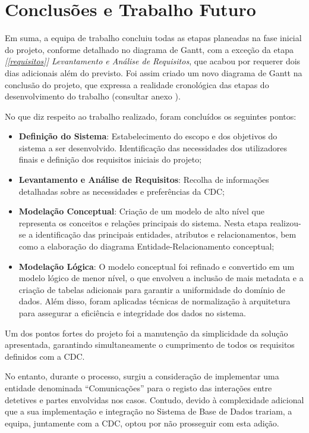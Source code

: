 \documentclass[a4paper,12pt]{scrreprt}
\begin{document}
\chapter{Conclusões e Trabalho Futuro}

    Em suma, a equipa de trabalho concluiu todas as etapas planeadas na fase inicial do projeto, conforme detalhado no diagrama de Gantt, com a exceção da etapa \textit{[\ref{requisitos}] Levantamento e Análise de Requisitos}, que acabou por requerer dois dias adicionais além do previsto. Foi assim criado um novo diagrama de Gantt na conclusão do projeto, que expressa a realidade cronológica das etapas do desenvolvimento do trabalho (consultar anexo \textit{}).

    No que diz respeito ao trabalho realizado, foram concluídos os seguintes pontos:
    \begin{itemize}
        \item \textbf{Definição do Sistema}: Estabelecimento do escopo e dos objetivos do sistema a ser desenvolvido. Identificação das necessidades dos utilizadores finais e definição dos requisitos iniciais do projeto;
        \item \textbf{Levantamento e Análise de Requisitos}: Recolha de informações detalhadas sobre as necessidades e preferências da CDC;
        \item \textbf{Modelação Conceptual}: Criação de um modelo de alto nível que representa os conceitos e relações principais do sistema. Nesta etapa realizou-se a identificação das principais entidades, atributos e relacionamentos, bem como a elaboração do diagrama
        Entidade-Relacionamento conceptual;
        \item \textbf{Modelação Lógica}: O modelo conceptual foi refinado e convertido em um modelo lógico de menor nível, o que envolveu a inclusão de mais metadata e a criação de tabelas adicionais para garantir a uniformidade do domínio de dados. Além disso, foram aplicadas técnicas de normalização à arquitetura para assegurar a eficiência e integridade dos dados no sistema.
    \end{itemize}

    Um dos pontos fortes do projeto foi a manutenção da simplicidade da solução apresentada, garantindo simultaneamente o cumprimento de todos os requisitos definidos com a CDC.

    No entanto, durante o processo, surgiu a consideração de implementar uma entidade denominada “Comunicações” para o registo das interações entre detetives e partes envolvidas nos casos. Contudo, devido à complexidade adicional que a sua implementação e integração no Sistema de Base de Dados trariam, a equipa, juntamente com a CDC, optou por não prosseguir com esta adição.
\end{document}
